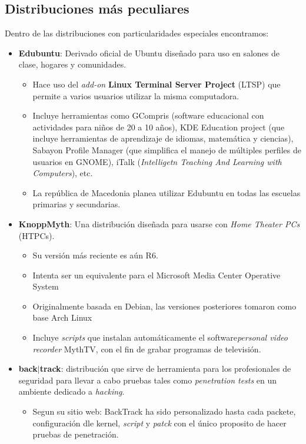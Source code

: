 \documentclass[spanish]{article}
\begin{document}
\subsection{Distribuciones más peculiares}
Dentro de las distribuciones con particularidades especiales encontramos:
\begin{itemize}
	\item \textbf{Edubuntu}: Derivado oficial de Ubuntu diseñado para uso en salones de clase, hogares y comunidades.
		\begin{itemize}
			\item Hace uso del \textit{add-on} \textbf{Linux Terminal Server Project} (LTSP) que permite a varios usuarios utilizar la misma computadora.
			\item Incluye herramientas como GCompris (software educacional con actividades para niños de 20 a 10 años), KDE Education project (que incluye herramientas de aprendizaje de idiomas, matemática y ciencias), Sabayon Profile Manager (que simplifica el manejo de múltiples perfiles de usuarios en GNOME), iTalk (\textit{Intelligetn Teaching And Learning with Computers}), etc. 
			\item La república de Macedonia planea utilizar Edubuntu en todas las escuelas primarias y secundarias\cite{macedonia}.
		\end{itemize}
	\item \textbf{KnoppMyth}: Una distribución diseñada para usarse con \textit{Home Theater PCs} (HTPCs). 
		\begin{itemize}
			\item Su versión más reciente es aún R6. 
			\item Intenta ser un equivalente para el Microsoft Media Center Operative System
			\item Originalmente basada en Debian, las versiones posteriores tomaron como base Arch Linux
			\item Incluye \textit{scripts} que instalan automáticamente el software\textit{personal video recorder} MythTV, con el fin de grabar programas de televisión.
		\end{itemize}
	\item \textbf{back}$|$\textbf{track}: distribución que sirve de herramienta para los profesionales de seguridad para llevar a cabo pruebas tales como \textit{penetration tests} en un ambiente dedicado a \textit{hacking}.
		\begin{itemize}
			\item Segun su sitio web: BackTrack ha sido personalizado hasta cada packete, configuración dle kernel, \textit{script} y \textit{patck} con el único proposito de hacer pruebas de penetración.

\end{itemize}
\end{itemize}
\end{document}
